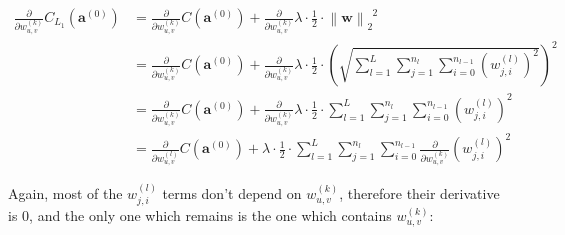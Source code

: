 \documentclass{article}
\begin{document}
            \begin{equation}
              \begin{split}
                \frac{\partial}{\partial w_{u,v}^{(k)}}
                  C_{L_1} \left( \mathbf{a}^{(0)} \right)
                    & = \frac{\partial}{\partial w_{u,v}^{(k)}}
                          C \left( \mathbf{a}^{(0)} \right)
                        +
                        \frac{\partial}{\partial w_{u,v}^{(k)}}
                          \lambda
                          \cdot
                          \frac{1}{2}
                          \cdot
                          \left\| \mathbf{w} \right\|_2^{\enspace 2}  \\
                    & = \frac{\partial}{\partial w_{u,v}^{(k)}}
                          C \left( \mathbf{a}^{(0)} \right)
                        +
                        \frac{\partial}{\partial w_{u,v}^{(k)}}
                          \lambda
                          \cdot
                          \frac{1}{2}
                          \cdot
                          \left(
                            \sqrt{
                              \sum_{l=1}^L \sum_{j=1}^{n_l} \sum_{i=0}^{n_{l-1}}
                                \left( w_{j,i}^{(l)} \right)^2
                            }
                          \right)^2 \\
                    & = \frac{\partial}{\partial w_{u,v}^{(k)}}
                          C \left( \mathbf{a}^{(0)} \right)
                        +
                        \frac{\partial}{\partial w_{u,v}^{(k)}}
                          \lambda
                          \cdot
                          \frac{1}{2}
                          \cdot
                          \sum_{l=1}^L \sum_{j=1}^{n_l} \sum_{i=0}^{n_{l-1}}
                            \left( w_{j,i}^{(l)} \right)^2 \\
                    & = \frac{\partial}{\partial w_{u,v}^{(l)}}
                          C \left( \mathbf{a}^{(0)} \right)
                        +
                        \lambda
                        \cdot
                        \frac{1}{2}
                        \cdot
                        \sum_{l=1}^L \sum_{j=1}^{n_l} \sum_{i=0}^{n_{l-1}}
                          \frac{\partial}{\partial w_{u,v}^{(k)}}
                            \left( w_{j,i}^{(l)} \right)^2
              \end{split}
            \end{equation}

            Again, most of the $w_{j,i}^{(l)}$ terms don't depend on
            $w_{u,v}^{(k)}$, therefore their derivative is $0$, and the only one
            which remains is the one which contains $w_{u,v}^{(k)}$:
\end{document}
